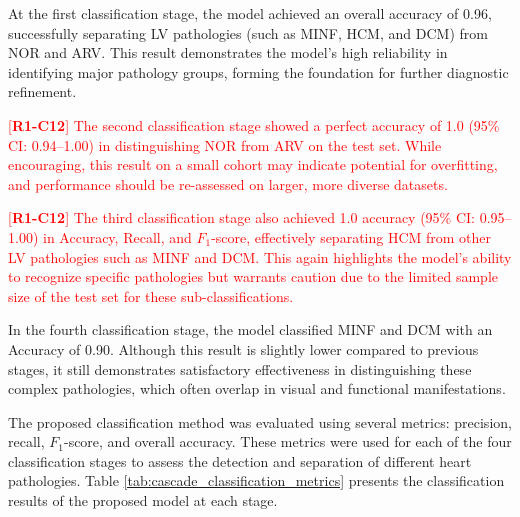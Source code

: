 \documentclass[fleqn,10pt]{wlscirep}
\newcommand{\revtag}[2]{[\textbf{R#1-C#2}]}
\newcommand{\Rone}[1]{\textcolor{red}{#1}}
\begin{document}
At the first classification stage, the model achieved an overall accuracy of 0.96, successfully separating LV pathologies (such as MINF, HCM, and DCM) from NOR and ARV. This result demonstrates the model’s high reliability in identifying major pathology groups, forming the foundation for further diagnostic refinement.

\Rone{\revtag{1}{12} %
The second classification stage showed a perfect accuracy of 1.0 (95\% CI: 0.94–1.00) in distinguishing NOR from ARV on the test set. While encouraging, this result on a small cohort may indicate potential for overfitting, and performance should be re-assessed on larger, more diverse datasets.
}

\Rone{\revtag{1}{12} %
The third classification stage also achieved 1.0 accuracy (95\% CI: 0.95–1.00) in Accuracy, Recall, and \({F_1}\)-score, effectively separating HCM from other LV pathologies such as MINF and DCM. This again highlights the model’s ability to recognize specific pathologies but warrants caution due to the limited sample size of the test set for these sub-classifications.
}

In the fourth classification stage, the model classified MINF and DCM with an Accuracy of 0.90. Although this result is slightly lower compared to previous stages, it still demonstrates satisfactory effectiveness in distinguishing these complex pathologies, which often overlap in visual and functional manifestations.

The proposed classification method was evaluated using several metrics: precision, recall, \({F_1}\)-score, and overall accuracy. These metrics were used for each of the four classification stages to assess the detection and separation of different heart pathologies. Table \ref{tab:cascade_classification_metrics} presents the classification results of the proposed model at each stage.
\end{document}
